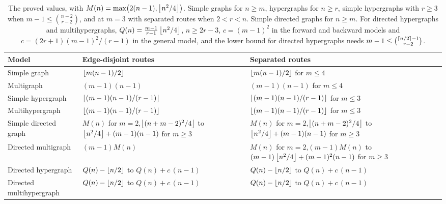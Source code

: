 \begin{table}[ht]
\centering
\small
\renewcommand{\arraystretch}{1.35}
\begin{tabularx}{\textwidth}{@{}l>{\raggedright\arraybackslash}X>{\raggedright\arraybackslash}X@{}}
\toprule
Model & Edge-disjoint routes & Separated routes \\
\midrule
Simple graph & $\left\lfloor m(n-1)/2 \right\rfloor$ & $\left\lfloor m(n-1)/2 \right\rfloor$ for $m\le4$ \\
Multigraph & $(m-1)(n-1)$ & $(m-1)(n-1)$ for $m\le4$ \\
Simple hypergraph & $\left\lfloor (m-1)(n-1)/(r-1) \right\rfloor$ & $\left\lfloor (m-1)(n-1)/(r-1) \right\rfloor$ for $m\le3$ \\
Multihypergraph & $\left\lfloor (m-1)(n-1)/(r-1) \right\rfloor$ & $\left\lfloor (m-1)(n-1)/(r-1) \right\rfloor$ for $m\le3$ \\
Simple directed graph & $M(n)$ for $m=2$,\newline $\left\lfloor (n+m-2)^2/4 \right\rfloor$ to $\left\lfloor n^2/4 \right\rfloor+(m-1)(n-1)$ for $m\ge3$ & $M(n)$ for $m=2$,\newline $\left\lfloor (n+m-2)^2/4 \right\rfloor$ to $\left\lfloor n^2/4 \right\rfloor+(m-1)(n-1)$ for $m\ge3$ \\
Directed multigraph & $(m-1)M(n)$ & $M(n)$ for $m=2$,\newline $(m-1)M(n)$ to $(m-1)\left\lfloor n^2/4 \right\rfloor+(m-1)^2(n-1)$ for $m\ge3$ \\
Directed hypergraph & $Q(n)-\left\lfloor n/2 \right\rfloor$ to $Q(n)+c\,(n-1)$ & $Q(n)-\left\lfloor n/2 \right\rfloor$ to $Q(n)+c\,(n-1)$ \\
Directed multihypergraph & $Q(n)-\left\lfloor n/2 \right\rfloor$ to $Q(n)+c\,(n-1)$ & $Q(n)-\left\lfloor n/2 \right\rfloor$ to $Q(n)+c\,(n-1)$ \\
\bottomrule
\end{tabularx}
\caption{The proved values, with $M(n)=\max\bigl(2(n-1),\left\lfloor n^2/4 \right\rfloor\bigr)$. Simple graphs for $n\ge m$, hypergraphs for $n\ge r$, simple hypergraphs with $r\ge3$ when $m-1\le\binom{n-2}{r-2}$, and at $m=3$ with separated routes when $2<r<n$. Simple directed graphs for $n\ge m$. For directed hypergraphs and multihypergraphs, $Q(n)=\frac{m-1}{r-1}\left\lfloor n^2/4 \right\rfloor$, $n\ge2r-3$, $c=(m-1)^2$ in the forward and backward models and $c=(2r+1)(m-1)^2/(r-1)$ in the general model, and the lower bound for directed hypergraphs needs $m-1\le\binom{\left\lceil n/2 \right\rceil-1}{r-2}$.}
\label{tab:conclusion}
\end{table}
